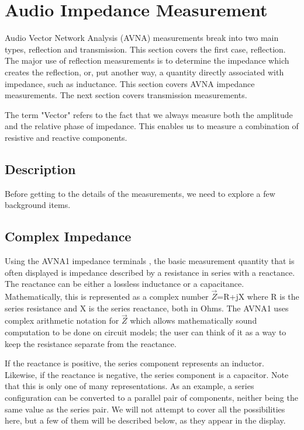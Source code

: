 \section{Audio Impedance Measurement}
\label{sect:ZMeas}
%
Audio Vector Network Analysis (AVNA) measurements break into two main types,  reflection and transmission.  This section covers the first case, reflection.  The major use of reflection measurements is to determine the impedance
which creates the reflection, or, put another way, a quantity directly associated with impedance, such as inductance. This section covers AVNA impedance measurements. The next section covers transmission measurements.

The term "Vector" refers to the fact that we always measure both the amplitude and the relative phase of impedance.  This enables us to measure a combination of resistive and reactive components.
%
\subsection{Description}
\label{subsect:ZDescr}
Before getting to the details of the measurements, we need to explore a few background items.

\subsection{Complex Impedance}Using the AVNA1 impedance  terminals , the basic measurement quantity that is often displayed is impedance described by a resistance in series with a reactance. The reactance can be either a lossless inductance or a capacitance. Mathematically, this is represented as a complex number $\vec{Z}$=R+jX where R is the series resistance and X is the series reactance, both in Ohms. The AVNA1 uses complex arithmetic notation for $\vec{Z}$ which allows mathematically sound computation to be done on circuit models; the user can think of it as a way to keep the resistance separate from the reactance.

If the reactance is positive, the series component represents an inductor. Likewise, if the reactance is negative, the series component is a capacitor.  Note that this is only one of many representations. As an example, a series configuration can be converted to a parallel pair of components, neither being the same value as the series pair.  We will not attempt to cover all the possibilities here, but a few of them will be described below, as they appear in the display.

